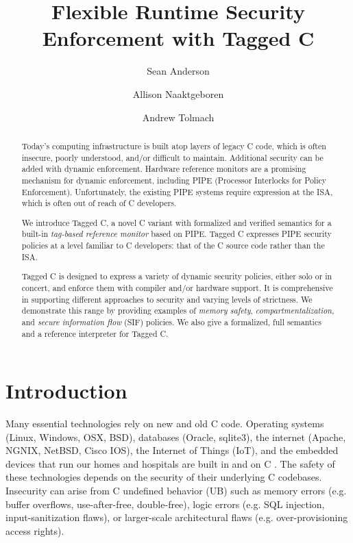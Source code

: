 \documentclass{llncs}
\title{Flexible Runtime Security Enforcement with Tagged C}
\author{Sean Anderson \and Allison Naaktgeboren \and Andrew Tolmach}
\institute{Portland State University}
\begin{document}





\maketitle

\begin{abstract}
Today's computing infrastructure is built atop layers of legacy C code, 
which is often insecure, poorly understood, and/or difficult to maintain.
Additional security can be added with dynamic enforcement. Hardware reference monitors 
are a promising mechanism for dynamic enforcement, including PIPE (Processor
Interlocks for Policy Enforcement). Unfortunately, the existing PIPE systems
require expression at the ISA, which is often out of reach of C developers.

We introduce Tagged C, a novel C variant with formalized and verified semantics 
for a built-in {\em tag-based reference monitor} based on PIPE.
Tagged C expresses PIPE security policies at a level familiar to C developers: that
of the C source code rather than the ISA.

Tagged C is designed to express a variety of dynamic security policies,  
either solo or in concert, and enforce them with compiler and/or hardware support.
It is comprehensive in supporting different
approaches to security and varying levels of strictness. We demonstrate
this range by providing examples of {\em memory safety}, {\em compartmentalization},
and {\em secure information flow} (SIF) policies. We also give a formalized, full semantics
and a reference interpreter for Tagged C.
\end{abstract}

\section{Introduction}
Many essential technologies rely on new and old C code.
Operating systems (Linux, Windows, OSX, BSD), databases (Oracle, sqlite3), the internet
(Apache, NGNIX, NetBSD, Cisco IOS), the Internet of Things (IoT), and the 
embedded devices that run our homes and hospitals are built in and on C \cite{Munoz:PoweredbyC}. 
The safety of these technologies
depends on the security of their underlying C codebases.
Insecurity can arise from C
undefined behavior (UB) such as memory errors (e.g. buffer overflows, use-after-free, double-free),
logic errors (e.g. SQL injection, input-sanitization flaws), or
larger-scale architectural flaws (e.g. over-provisioning access rights).
\end{document}
